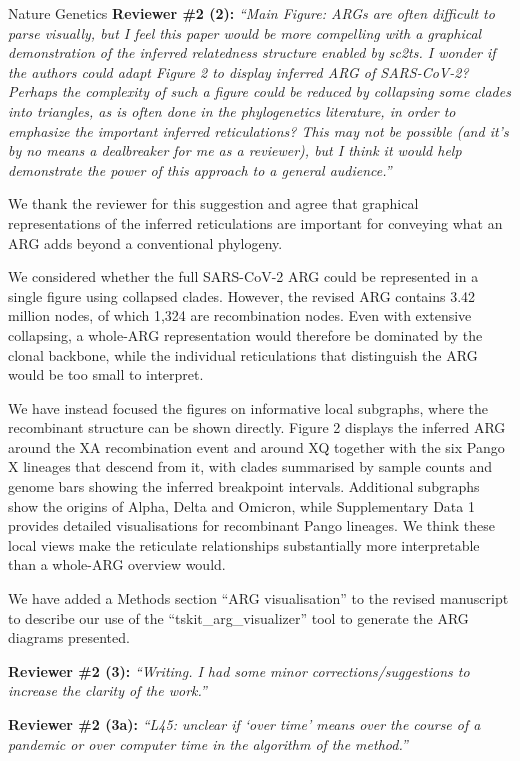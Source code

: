 \documentclass{letter}
\begin{document}
\begin{letter}{Nature Genetics}
\noindent \textbf{Reviewer \#2 (2):} \textit{``Main Figure: ARGs are often difficult to
parse visually, but I feel this paper would be more compelling with a
graphical demonstration of the inferred relatedness structure enabled by
sc2ts. I wonder if the authors could adapt Figure 2 to display inferred ARG of
SARS-CoV-2? Perhaps the complexity of such a figure could be reduced by
collapsing some clades into triangles, as is often done in the phylogenetics
literature, in order to emphasize the important inferred reticulations? This
may not be possible (and it's by no means a dealbreaker for me as a reviewer),
but I think it would help demonstrate the power of this approach to a general
audience.''}

We thank the reviewer for this suggestion and agree that graphical
representations of the inferred reticulations are important for conveying what
an ARG adds beyond a conventional phylogeny.

We considered whether the full SARS-CoV-2 ARG could be represented in a single
figure using collapsed clades. However, the revised ARG contains 3.42 million
nodes, of which 1,324 are recombination nodes. Even with extensive collapsing,
a whole-ARG representation would therefore be dominated by the clonal backbone,
while the individual reticulations that distinguish the ARG would be too small
to interpret.

We have instead focused the figures on informative local subgraphs, where the
recombinant structure can be shown directly. Figure 2 displays the inferred ARG
around the XA recombination event and around XQ together with the six Pango X
lineages that descend from it, with clades summarised by sample counts and
genome bars showing the inferred breakpoint intervals. Additional subgraphs
show the origins of Alpha, Delta and Omicron, while Supplementary Data 1 provides
detailed visualisations for recombinant Pango lineages. We think these local
views make the reticulate relationships substantially more interpretable than a
whole-ARG overview would.

We have added a Methods section ``ARG visualisation'' to the revised
manuscript to describe our use of the ``tskit\_arg\_visualizer'' tool
to generate the ARG diagrams presented.

\noindent \textbf{Reviewer \#2 (3):} \textit{``Writing. I had some minor
corrections/suggestions to increase the clarity of the work.''}

\noindent \textbf{Reviewer \#2 (3a):} \textit{``L45: unclear if `over time' means over
the course of a pandemic or over computer time in the algorithm of the
method.''}


\end{letter}
\end{document}

